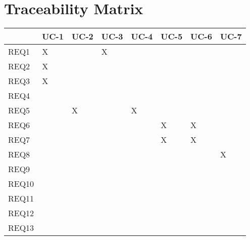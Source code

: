 \documentclass[11pt]{article}
\begin{document}
\newpage


\section{Traceability Matrix}

\begin{center}
\begin{tabular}{|l|l|l|l|l|l|l|l|}
\hline
& UC-1 & UC-2 & UC-3 & UC-4 & UC-5 & UC-6& UC-7 \\ \hline
REQ1 & X &  & X  &  &  &  &\\ \hline
REQ2 & X &  &  &  &  &  &\\ \hline
REQ3 & X &  &  &  &  &  &\\ \hline
REQ4 &  &  &  &  &  &  &\\ \hline
REQ5 &  & X &  &  X&  & & \\ \hline
REQ6 &  &  &  &  &  X& X  &\\ \hline
REQ7 &  &  &  &  &  X& X  &\\ \hline
REQ8 &  &  &  &  &  &  & X\\ \hline
REQ9 &  &  &  &  &  &  &\\ \hline
REQ10 &  &  &  &  &  &  &\\ \hline
REQ11 &  &  &  &  &  &  &\\ \hline
REQ12 &  &  &  &  &  &  &\\ \hline
REQ13 &  &  &  &  &  &  &\\ \hline
\end{tabular}
\end{center}
\end{document}
